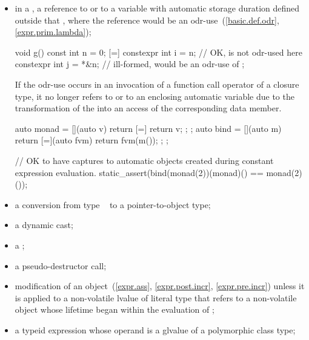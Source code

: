 \begin{itemize}
\item
in a ,
a reference to  or to a variable with
automatic storage duration defined outside that
, where
the reference would be an odr-use~(\ref{basic.def.odr}, \ref{expr.prim.lambda});
\begin{example}
\begin{codeblock}
void g() {
  const int n = 0;
  [=] {
    constexpr int i = n;   // OK,  is not odr-used here
    constexpr int j = *&n; // ill-formed,  would be an odr-use of 
  };
}
\end{codeblock}
\end{example}
\begin{note}
If the odr-use occurs in an invocation
of a function call operator of a closure type,
it no longer refers to  or to an enclosing automatic variable
due to the transformation
of the  into
an access of the corresponding data member.
\begin{example}
\begin{codeblock}
auto monad = [](auto v) { return [=] { return v; }; };
auto bind = [](auto m) {
  return [=](auto fvm) { return fvm(m()); };
};

// OK to have captures to automatic objects created during constant expression evaluation.
static_assert(bind(monad(2))(monad)() == monad(2)());
\end{codeblock}
\end{example}
\end{note}

\item
a conversion from type \cv{}~ to a pointer-to-object type;

\item
a dynamic cast;

\item
a ;

\item
a pseudo-destructor call;

\item
modification of an object~(\ref{expr.ass}, \ref{expr.post.incr},
\ref{expr.pre.incr})
unless it is applied to a non-volatile lvalue of literal type
that refers to a non-volatile object
whose lifetime began within the evaluation of ;

\item
a typeid expression whose operand is a glvalue of a
polymorphic class type;


\end{itemize}

